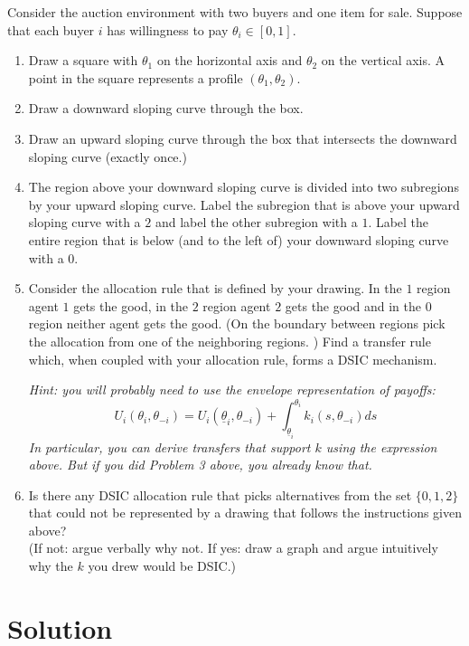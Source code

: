 \documentclass[a4paper]{article}
\newif\ifsolutions
\begin{document}
Consider the auction environment with two buyers and one item for sale. Suppose that each buyer $i$ has willingness to pay $\theta_i \in [0,1].$
\begin{enumerate}
	\item Draw a square with $\theta_1$ on the horizontal axis and $\theta_2$ on the vertical axis.  A point in the square
	represents a profile $(\theta_1, \theta_2)$.
	\item Draw a downward sloping curve through the box.
	\item Draw an upward sloping curve through the box that intersects the downward sloping curve (exactly once.)
	\item The region above your downward sloping curve is divided into two subregions by your upward sloping curve.  Label
	the subregion that is above your upward sloping curve with a $2$ and label the other subregion with a $1$.  Label
	the entire region that is below (and to the left of) your downward sloping curve with a $0$.
	\item Consider the allocation rule that is defined by your drawing.  In the $1$ region agent $1$ gets the
	good, in the $2$ region agent $2$ gets the good and in the $0$ region neither agent gets the good.  (On the boundary
	between regions pick the allocation from one of the neighboring regions. )  Find a transfer rule which, when
	coupled with your allocation rule, forms a DSIC mechanism.
	
	\emph{Hint: you will probably need to use the envelope representation of payoffs:}
	\begin{equation*}
		U_i(\theta_i, \theta_{-i}) = U_i (\underline{\theta}_i,\theta_{-i}) + \int_{\underline{\theta}_i}^{\theta_i} k_i(s,\theta_{-i}) d s
	\end{equation*}
	\emph{In particular, you can derive transfers that support $k$ using the expression above. But if you did Problem 3 above, you already know that.}
	
	\item Is there any DSIC allocation rule that picks alternatives from the set $\{0,1,2\}$ that could not be represented by a drawing that follows the instructions given above?
	\\
	(If not: argue verbally why not. If yes: draw a graph and argue intuitively why the $k$ you drew would be DSIC.)
\end{enumerate}

\ifsolutions
\section*{Solution}
\end{document}
